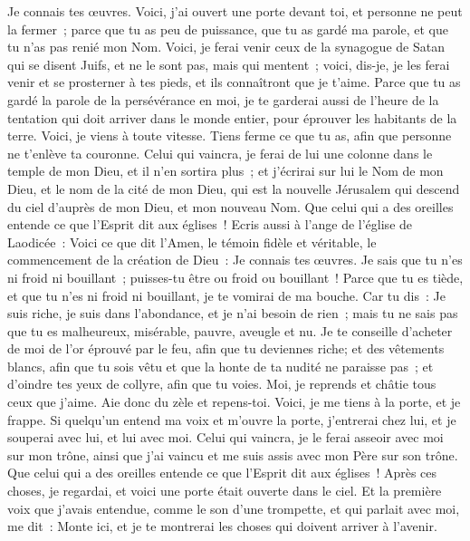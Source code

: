 \begin{multicols}{2}
Je connais tes œuvres. Voici, j'ai ouvert une porte devant toi, et personne ne peut la fermer~; parce que tu as peu de puissance, que tu as gardé ma parole, et que tu n'as pas renié mon Nom.
Voici, je ferai venir ceux de la synagogue de Satan qui se disent Juifs, et ne le sont pas, mais qui mentent~; voici, dis-je, je les ferai venir et se prosterner à tes pieds, et ils connaîtront que je t'aime.
Parce que tu as gardé la parole de la persévérance en moi, je te garderai aussi de l'heure de la tentation qui doit arriver dans le monde entier, pour éprouver les habitants de la terre.
Voici, je viens à toute vitesse. Tiens ferme ce que tu as, afin que personne ne t'enlève ta couronne.
Celui qui vaincra, je ferai de lui une colonne dans le temple de mon Dieu, et il n'en sortira plus~; et j'écrirai sur lui le Nom de mon Dieu, et le nom de la cité de mon Dieu, qui est la nouvelle Jérusalem qui descend du ciel d'auprès de mon Dieu, et mon nouveau Nom.
Que celui qui a des oreilles entende ce que l'Esprit dit aux églises~!
Ecris aussi à l'ange de l'église de Laodicée~: Voici ce que dit l'Amen, le témoin fidèle et véritable, le commencement de la création de Dieu~:
Je connais tes œuvres. Je sais que tu n'es ni froid ni bouillant~; puisses-tu être ou froid ou bouillant~!
Parce que tu es tiède, et que tu n'es ni froid ni bouillant, je te vomirai de ma bouche.
Car tu dis~: Je suis riche, je suis dans l'abondance, et je n'ai besoin de rien~; mais tu ne sais pas que tu es malheureux, misérable, pauvre, aveugle et nu.
Je te conseille d'acheter de moi de l'or éprouvé par le feu, afin que tu deviennes riche; et des vêtements blancs, afin que tu sois vêtu et que la honte de ta nudité ne paraisse pas~; et d'oindre tes yeux de collyre, afin que tu voies.
Moi, je reprends et châtie tous ceux que j'aime. Aie donc du zèle et repens-toi.
Voici, je me tiens à la porte, et je frappe. Si quelqu'un entend ma voix et m'ouvre la porte, j'entrerai chez lui, et je souperai avec lui, et lui avec moi.
Celui qui vaincra, je le ferai asseoir avec moi sur mon trône, ainsi que j'ai vaincu et me suis assis avec mon Père sur son trône.
Que celui qui a des oreilles entende ce que l'Esprit dit aux églises~!
\VerseOne{}Après ces choses, je regardai, et voici une porte était ouverte dans le ciel. Et la première voix que j'avais entendue, comme le son d'une trompette, et qui parlait avec moi, me dit~: Monte ici, et je te montrerai les choses qui doivent arriver à l'avenir.

\end{multicols}
